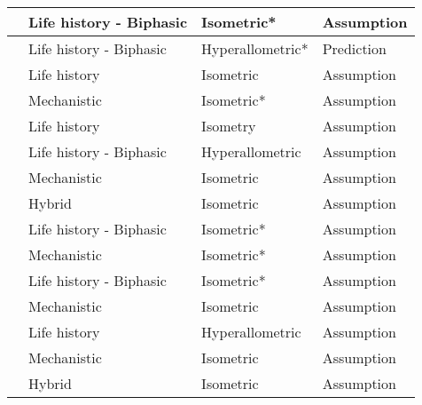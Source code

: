 \documentclass[a4paper]{article} %
\begin{document}
\begin{table}[H]
\begin{tabular}{|l|l|l|l|}
    \autocite{Quince2008}                   & Life history - Biphasic   & Isometric*       & Assumption                     \\ \hline
    \autocite{Quince2008b}                  & Life history - Biphasic   & Hyperallometric* & Prediction                     \\ \hline
    \autocite{Pecquerie2009}                & Life history              & Isometric        & Assumption                     \\ \hline
    \autocite{kooijman2010dynamic}          & Mechanistic               & Isometric*       & Assumption                     \\ \hline
    \autocite{Arendt2011}                   & Life history              & Isometry         & Assumption                     \\ \hline
    \autocite{Ohnishi2011}                  & Life history - Biphasic   & Hyperallometric  & Assumption                     \\ \hline
    \autocite{Brunel2013}                   & Mechanistic               & Isometric        & Assumption                     \\ \hline
    \autocite{Charnov2013}                  & Hybrid                    & Isometric        & Assumption                     \\ \hline
    \autocite{Boukal2014}                   & Life history - Biphasic   & Isometric*       & Assumption                     \\ \hline
    \autocite{Kooijman2014a}                & Mechanistic               & Isometric*       & Assumption                     \\ \hline
    \autocite{Minte-Vera2016a}              & Life history - Biphasic   & Isometric*       & Assumption                     \\ \hline
    \autocite{Jusup2017}                    & Mechanistic               & Isometric        & Assumption                     \\ \hline
    \autocite{Mangel2017}                   & Life history              & Hyperallometric  & Assumption                     \\ \hline
    \autocite{Smallegange2017}              & Mechanistic               & Isometric        & Assumption                     \\ \hline
    \autocite{Audzijonyte2018}              & Hybrid                    & Isometric        & Assumption                     \\ \hline

\end{tabular}
\end{table}
\end{document}
